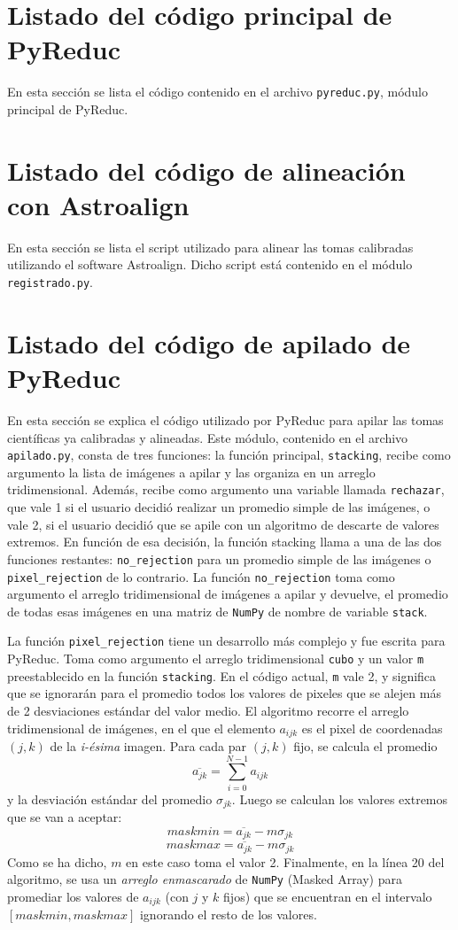 \documentclass[a4paper, 12pt]{article}
\begin{document}
\newpage
\appendix

\section{Listado del código principal de PyReduc}
En esta sección se lista el código contenido en el archivo {\tt pyreduc.py}, módulo principal de PyReduc.


\section{Listado del código de alineación con Astroalign}
En esta sección se lista el script utilizado para alinear las tomas calibradas utilizando el software Astroalign. Dicho script está contenido en el módulo \texttt{registrado.py}.


\section{Listado del código de apilado de PyReduc}
\label{sec:apilado}
En esta sección se explica el código utilizado por PyReduc para apilar las tomas científicas ya calibradas y alineadas. Este módulo, contenido en el archivo \texttt{apilado.py}, consta de tres funciones: la función principal, \texttt{stacking}, recibe como argumento la lista de imágenes a apilar y las organiza en un arreglo tridimensional. Además, recibe como argumento una variable llamada {\tt rechazar}, que vale 1 si el usuario decidió realizar un promedio simple de las imágenes, o vale 2, si el usuario decidió que se apile con un algoritmo de descarte de valores extremos. En función de esa decisión, la función stacking llama a una de las dos funciones restantes: {\tt no\_rejection} para un promedio simple de las imágenes o {\tt pixel\_rejection} de lo contrario. La función {\tt no\_rejection} toma como argumento el arreglo tridimensional de imágenes a apilar y devuelve, el promedio de todas esas imágenes en una matriz de \texttt{NumPy} de nombre de variable \texttt{stack}. 

La función {\tt pixel\_rejection} tiene un desarrollo más complejo y fue escrita para PyReduc. Toma como argumento el arreglo tridimensional \texttt{cubo} y un valor {\tt m} preestablecido en la función {\tt stacking}. En el código actual, {\tt m} vale 2, y significa que se ignorarán para el promedio todos los valores de pixeles que se alejen más de 2 desviaciones estándar del valor medio. El algoritmo recorre el arreglo tridimensional de imágenes, en el que el elemento $a_{ijk}$ es el pixel de coordenadas $(j,k)$ de la {\it i-ésima} imagen.
Para cada par $(j,k)$ fijo, se calcula el promedio $$\overline{a_{jk}}=\sum_{i=0}^{N-1}a_{ijk}$$
y la desviación estándar del promedio $\sigma_{jk}$. Luego se calculan los valores extremos que se van a aceptar:
$$maskmin = \overline{a_{jk}} - m\sigma_{jk}$$
$$maskmax = \overline{a_{jk}} - m\sigma_{jk}$$
Como se ha dicho, $m$ en este caso toma el valor 2. Finalmente, en la línea 20 del algoritmo, se usa un {\it arreglo enmascarado} de {\tt NumPy} (Masked Array) para promediar los valores de $a_{ijk}$ (con $j$ y $k$ fijos) que se encuentran en el intervalo $[maskmin, maskmax]$ ignorando el resto de los valores.
\end{document}
